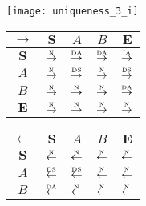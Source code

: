\begin{figure}[htbp]
  \begin{subfigure}{1\textwidth}
    \vspace{1em}
    \centering
    \begin{minipage}[b]{1\textwidth}
      \centering
      \texttt{[image: uniqueness\_3\_i]}
    \end{minipage}
    \begin{minipage}[b]{0.3\textwidth}
      \vspace{1em}
      \centering
      \begin{tabular}{|c|c|c|c|c|} \hline
        $\rightarrow$ & $\bm{S}$ & $A$ & $B$ & $\bm{E}$\\ \hline
        $\bm{S}$ & $\overset{\text{\tiny{N}}}{\rightarrow}$ & $\overset{\text{\tiny{DA}}}{\rightarrow}$ & $\overset{\text{\tiny{DA}}}{\rightarrow}$ & $\overset{\text{\tiny{IA}}}{\rightarrow}$\\ \hline
        $A$ & $\overset{\text{\tiny{N}}}{\rightarrow}$ & $\overset{\text{\tiny{DS}}}{\rightarrow}$ & $\overset{\text{\tiny{N}}}{\rightarrow}$ & $\overset{\text{\tiny{DS}}}{\rightarrow}$\\ \hline
        $B$ & $\overset{\text{\tiny{N}}}{\rightarrow}$ & $\overset{\text{\tiny{N}}}{\rightarrow}$ & $\overset{\text{\tiny{N}}}{\rightarrow}$ & $\overset{\text{\tiny{DA}}}{\rightarrow}$\\ \hline
        $\bm{E}$ & $\overset{\text{\tiny{N}}}{\rightarrow}$ & $\overset{\text{\tiny{N}}}{\rightarrow}$ & $\overset{\text{\tiny{N}}}{\rightarrow}$ & $\overset{\text{\tiny{N}}}{\rightarrow}$\\ \hline
      \end{tabular}
    \end{minipage}
    \begin{minipage}[b]{0.3\textwidth}
      \vspace{1em}
      \centering
      \begin{tabular}{|c|c|c|c|c|} \hline
        $\leftarrow$ & $\bm{S}$ & $A$ & $B$ & $\bm{E}$\\ \hline
        $\bm{S}$ & $\overset{\text{\tiny{N}}}{\leftarrow}$ & $\overset{\text{\tiny{N}}}{\leftarrow}$ & $\overset{\text{\tiny{N}}}{\leftarrow}$ & $\overset{\text{\tiny{N}}}{\leftarrow}$\\ \hline
        $A$ & $\overset{\text{\tiny{DS}}}{\leftarrow}$ & $\overset{\text{\tiny{DS}}}{\leftarrow}$ & $\overset{\text{\tiny{N}}}{\leftarrow}$ & $\overset{\text{\tiny{N}}}{\leftarrow}$\\ \hline
        $B$ & $\overset{\text{\tiny{DA}}}{\leftarrow}$ & $\overset{\text{\tiny{N}}}{\leftarrow}$ & $\overset{\text{\tiny{N}}}{\leftarrow}$ & $\overset{\text{\tiny{N}}}{\leftarrow}$\\ \hline

\end{tabular}
\end{minipage}
\end{subfigure}
\end{figure}
